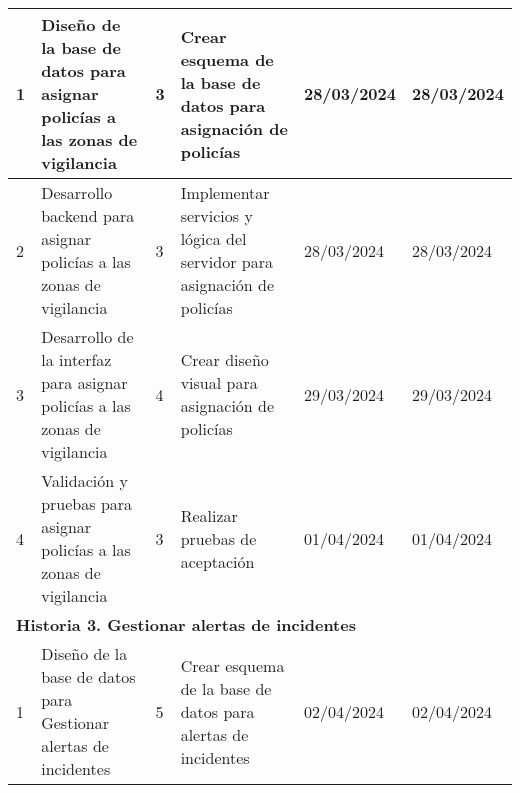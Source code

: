 \begin{longtable}{|p{0.5cm}|p{2cm}|p{1cm}|p{3cm}|p{1cm}|p{1cm}|}
    1                                        & Diseño de la base de datos para asignar policías a las zonas de vigilancia & 3                                                              & Crear esquema de la base de datos para asignación de policías           & 28/03/2024                                                    & 28/03/2024                                                          \\ \hline
    2                                        & Desarrollo backend para asignar policías a las zonas de vigilancia         & 3                                                              & Implementar servicios y lógica del servidor para asignación de policías & 28/03/2024                                                    & 28/03/2024                                                          \\ \hline
    3                                        & Desarrollo de la interfaz para asignar policías a las zonas de vigilancia  & 4                                                              & Crear diseño visual para asignación de policías                         & 29/03/2024                                                    & 29/03/2024                                                          \\ \hline
    4                                        & Validación y pruebas para asignar policías a las zonas de vigilancia       & 3                                                              & Realizar pruebas de aceptación                                          & 01/04/2024                                                    & 01/04/2024                                                          \\ \hline
    \multicolumn{6}{|l|}{\textbf{Historia 3. Gestionar alertas de incidentes}}                                                                                                                                                                                                                                                                                                                            \\ \hline
    1                                        & Diseño de la base de datos para Gestionar alertas de incidentes           & 5                                                              & Crear esquema de la base de datos para alertas de incidentes            & 02/04/2024                                                    & 02/04/2024                                                          \\ \hline

\end{longtable}
